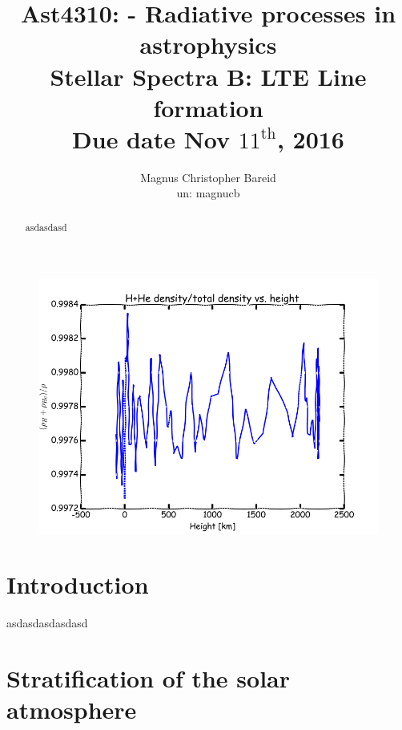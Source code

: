 \documentclass[11pt,a4paper,notitlepage]{article}
\title{\normalsize Ast4310: - Radiative processes in astrophysics \\
\vspace{10mm}
\huge Stellar Spectra B: LTE Line formation\\
\vspace{10mm}
\normalsize Due date {\bf Nov $11^\text{th}$, 2016}}
\author{Magnus Christopher Bareid \\ un: magnucb }
\begin{document}
\noindent
\maketitle
\vspace{5mm}

\begin{figure}[H]
	\centering	
	\includegraphics[scale=0.45]{frontpage.png}
\end{figure}
\begin{abstract}
asdasdasd

\end{abstract}


\newpage
\tableofcontents

\newpage
\section*{Introduction}
asdasdasdasdasd

\section{Stratification of the solar atmosphere} 						%
\end{document}
